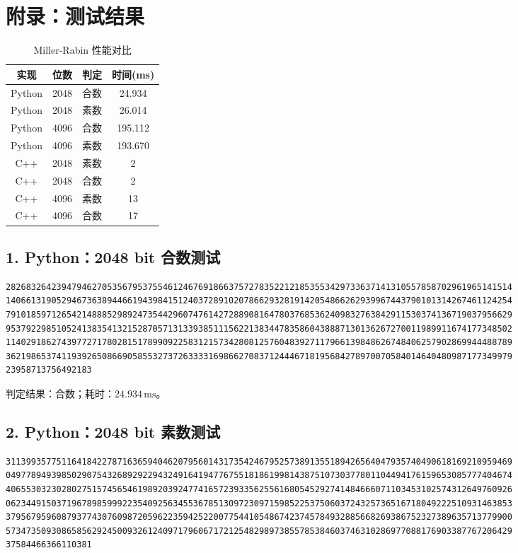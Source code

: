 \documentclass[12pt,a4paper]{article}
\begin{document}
\section*{附录：测试结果}
\begin{table}[htbp]
\centering
\begin{tabular}{cccc}
\toprule
实现 & 位数 & 判定 & 时间(ms) \\
\midrule
Python & 2048 & 合数 & 24.934 \\
Python & 2048 & 素数 & 26.014 \\
Python & 4096 & 合数 & 195.112 \\
Python & 4096 & 素数 & 193.670 \\
C++ & 2048 & 素数 & 2 \\
C++ & 2048 & 合数 & 2 \\
C++ & 4096 & 素数 & 13 \\
C++ & 4096 & 合数 & 17 \\
\bottomrule
\end{tabular}
\caption{Miller-Rabin 性能对比}
\end{table}

\subsection*{1. Python：2048 bit 合数测试}

\begin{lstlisting}[style=numstyle]
2826832642394794627053567953755461246769186637572783522121853553429733637141310557858702961965141514
1406613190529467363894466194398415124037289102078662932819142054866262939967443790101314267461124254
7910185971265421488852989247354429607476142728890816478037685362409832763842911530374136719037956629
9537922985105241383541321528705713133938511156221383447835860438887130136267270011989911674177348502
1140291862743977271780281517899092258312157342808125760483927117966139848626748406257902869944488789
3621986537411939265086690585532737263333169866270837124446718195684278970070584014640480987177349979
23958713756492183
\end{lstlisting}

\noindent 判定结果：合数；耗时：$24.934\,\mathrm{ms}$。

\subsection*{2. Python：2048 bit 素数测试}

\begin{lstlisting}[style=numstyle]
3113993577511641842278716365940462079560143173542467952573891355189426564047935740490618169210959469
0497789493985029075432689292294324916419477675518186199814387510730377801104494176159653085777404674
4065530323028027515745654619892039247741657239335625561680545292741484666071103453102574312649760926
0623449150371967898599922354092563455367851309723097159852253750603724325736516718049222510931463853
3795679596087937743076098720596223594252200775441054867423745784932885668269386752327389635713779900
5734735093086585629245009326124097179606717212548298973855785384603746310286977088176903387767206429
37584466366110381
\end{lstlisting}
\end{document}
